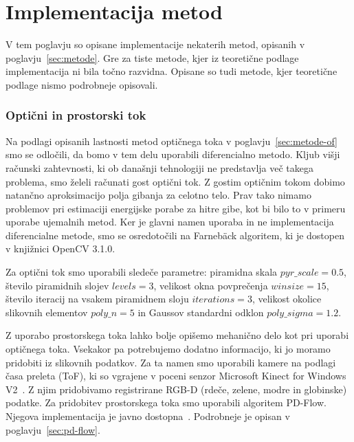 \chapter{Implementacija metod}
V tem poglavju so opisane implementacije nekaterih metod, opisanih v poglavju~\ref{sec:metode}. Gre za tiste metode, kjer iz teoretične podlage implementacija ni bila točno razvidna. Opisane so tudi metode, kjer teoretične podlage nismo podrobneje opisovali.

\subsection{Optični in prostorski tok}
Na podlagi opisanih lastnosti metod optičnega toka v poglavju~\ref{sec:metode-of} smo se odločili, da bomo v tem delu uporabili diferencialno metodo. Kljub višji računski zahtevnosti, ki ob današnji tehnologiji ne predstavlja več takega problema, smo želeli računati gost optični tok. Z gostim optičnim tokom dobimo natančno aproksimacijo polja gibanja za celotno telo. Prav tako nimamo problemov pri estimaciji energijske porabe za hitre gibe, kot bi bilo to v primeru uporabe ujemalnih metod. Ker je glavni namen uporaba in ne implementacija diferencialne metode, smo se osredotočili na Farneb{\"a}ck algoritem, ki je dostopen v knjižnici OpenCV 3.1.0.

Za optični tok smo uporabili sledeče parametre: piramidna skala $pyr\_scale=\num{0.5}$, število piramidnih slojev $levels=3$, velikost okna povprečenja $winsize=15$, število iteracij na vsakem piramidnem sloju $iterations=3$, velikost okolice slikovnih elementov $poly\_n=5$ in Gaussov standardni odklon $poly\_sigma=\num{1.2}$.

Z uporabo prostorskega toka lahko bolje opišemo mehanično delo kot pri uporabi optičnega toka. Vsekakor pa potrebujemo dodatno informacijo, ki jo moramo pridobiti iz slikovnih podatkov. Za ta namen smo uporabili kamere na podlagi časa preleta (ToF), ki so vgrajene v poceni senzor Microsoft Kinect for Windows V2~\cite{Yang2015KinectV2}. Z njim pridobivamo registrirane RGB-D (rdeče, zelene, modre in globinske) podatke. Za pridobitev prostorskega toka smo uporabili algoritem PD-Flow. Njegova implementacija je javno dostopna~\cite{jaimez2015primal}. Podrobneje je opisan v poglavju~\ref{sec:pd-flow}.



